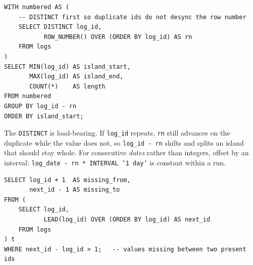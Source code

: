 \begin{lstlisting}[style=sql, caption={Islands of consecutive ids}]
WITH numbered AS (
    -- DISTINCT first so duplicate ids do not desync the row number
    SELECT DISTINCT log_id,
           ROW_NUMBER() OVER (ORDER BY log_id) AS rn
    FROM logs
)
SELECT MIN(log_id) AS island_start,
       MAX(log_id) AS island_end,
       COUNT(*)    AS length
FROM numbered
GROUP BY log_id - rn
ORDER BY island_start;
\end{lstlisting}

The \texttt{DISTINCT} is load-bearing. If \texttt{log\_id} repeats, \texttt{rn}
still advances on the duplicate while the value does not, so
\texttt{log\_id - rn} shifts and splits an island that should stay whole. For
consecutive \emph{dates} rather than integers, offset by an interval:
\texttt{log\_date - rn * INTERVAL `1 day'} is constant within a run.

\begin{lstlisting}[style=sql, caption={Gaps via LEAD}]
SELECT log_id + 1  AS missing_from,
       next_id - 1 AS missing_to
FROM (
    SELECT log_id,
           LEAD(log_id) OVER (ORDER BY log_id) AS next_id
    FROM logs
) t
WHERE next_id - log_id > 1;   -- values missing between two present ids
\end{lstlisting}
